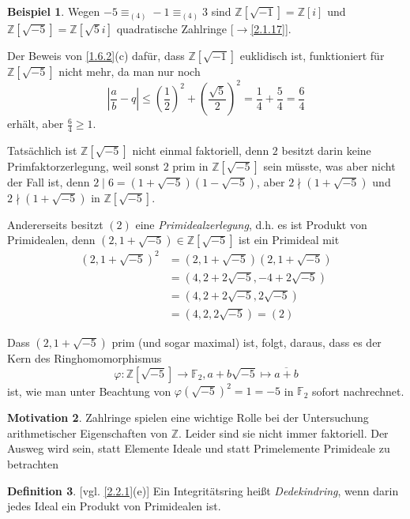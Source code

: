 \documentclass[
twoside=semi,
fontsize=12,
DIV=12, 
cleardoublepage=current,
leqno,
headings=optiontoheadandtoc, 
toc=idx
]{scrbook}
\newcommand{\Z}{\mathbb{Z}}
\newcommand{\F}{\mathbb{F}}
\newcommand{\brac}[1]{\left( #1 \right)}
\theoremstyle{definition}
\newtheorem{definition}{Definition}[section]
\newtheorem{beispiel}[definition]{Beispiel}
\newtheorem{motivation}[definition]{Motivation}
\begin{document}
 	\begin{beispiel}\label{2.2.2}\hfill\newline
 		Wegen $-5 \equiv_{(4)} -1 \equiv_{(4)} 3$ sind $\Z[\sqrt{-1}] = \Z[i]$ und $\Z[\sqrt{-5}] = \Z[\sqrt{5}i]$ quadratische Zahlringe [$\to$\ref{2.1.17}].
 		
 		Der Beweis von \ref{1.6.2}(c) daf\"ur, dass $\Z[\sqrt{-1}]$ euklidisch ist, funktioniert f\"ur $\Z[\sqrt{-5}]$ nicht mehr, da man nur noch 
 			\[\left| \frac{a}{b} - q\right| \leq \brac{\frac{1}{2}}^2 + \brac{\frac{\sqrt{5}}{2}}^2 = \frac{1}{4} + \frac{5}{4} = \frac{6}{4}\]
 		erh\"alt, aber $\frac{6}{4} \geq 1$. 
 		
 		Tats\"achlich ist $\Z[\sqrt{-5}]$ nicht einmal faktoriell, denn $2$ besitzt darin keine Primfaktorzerlegung, weil sonst $2$ prim in $\Z[\sqrt{-5}]$ sein m\"usste, was aber nicht der Fall
 		ist, denn $2 \mid 6 = (1+\sqrt{-5})(1-\sqrt{-5})$, aber $2\nmid (1+\sqrt{-5})$ und $2 \nmid (1+\sqrt{-5})$ in $\Z[\sqrt{-5}]$. 
 		
 		\medskip\noindent Andererseits besitzt $(2)$ eine \emph{Primidealzerlegung}, d.h. es ist Produkt von Primidealen, denn $(2,1+\sqrt{-5}) \in \Z[\sqrt{-5}]$ ist ein Primideal mit 
 		\begin{align*}
 			(2,1+\sqrt{-5})^2 &= (2,1+\sqrt{-5})(2,1+\sqrt{-5})\\
 			&= (4, 2 + 2\sqrt{-5}, -4 + 2\sqrt{-5})\\
 			&= (4, 2+2\sqrt{-5},2\sqrt{-5})\\
 			&= (4,2,2\sqrt{-5}) = (2)
 		\end{align*}
 	
 		Dass $(2,1+\sqrt{-5})$ prim (und sogar maximal) ist, folgt, daraus, dass es der Kern des Ringhomomorphismus
 			\[\varphi:\Z[\sqrt{-5}]\to \F_2, a+b\sqrt{-5} \mapsto \overline{a+b}\]
 		ist, wie man unter Beachtung von $\varphi(\sqrt{-5})^2 = 1 = -5$ in $\F_2$ sofort nachrechnet.
 	\end{beispiel}
 
 	\begin{motivation}\label{2.2.3}\hfill\newline
 		Zahlringe spielen eine wichtige Rolle bei der Untersuchung arithmetischer Eigenschaften von $\Z$. Leider sind sie nicht immer faktoriell. Der Ausweg wird sein, statt Elemente Ideale und statt Primelemente Primideale zu betrachten
 	\end{motivation}
 
 	\begin{definition}\label{2.2.4} [vgl. \ref{2.2.1}(e)]\newline
 		Ein Integrit\"atsring hei\ss t \emph{Dedekindring}, wenn darin jedes Ideal ein Produkt von Primidealen ist.
 	\end{definition}
 
\end{document}

